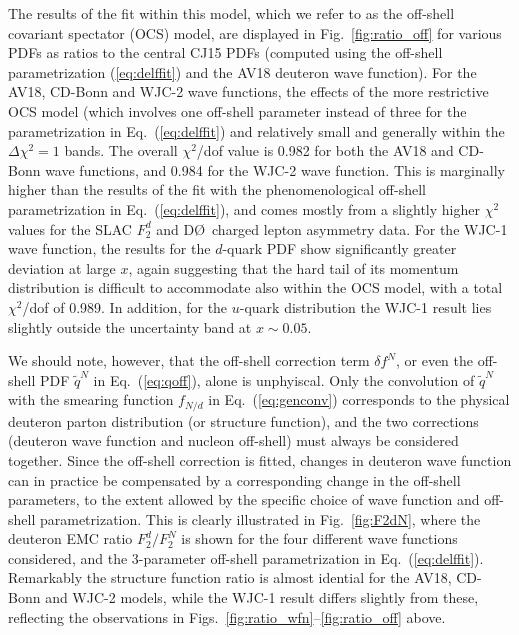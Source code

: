 \documentclass[aps,prd,amsmath,preprint]{revtex4}
\begin{document}
The results of the fit within this model, which we refer to as
the off-shell covariant spectator (OCS) model, are displayed in
Fig.~\ref{fig:ratio_off} for various PDFs as ratios to the
central CJ15 PDFs (computed using the off-shell parametrization
(\ref{eq:delffit}) and the AV18 deuteron wave function).
For the AV18, CD-Bonn and WJC-2 wave functions, the effects of
the more restrictive OCS model (which involves one off-shell
parameter instead of three for the parametrization in
Eq.~(\ref{eq:delffit}) and relatively small and generally
within the $\Delta\chi^2=1$ bands.
The overall $\chi^2$/dof value is 0.982 for both the AV18 and
CD-Bonn wave functions, and 0.984 for the WJC-2 wave function.
This is marginally higher than the results of the fit with the
phenomenological off-shell parametrization in Eq.~(\ref{eq:delffit}),
and comes mostly from a slightly higher $\chi^2$ values for the
SLAC $F_2^d$ and D\O\ charged lepton asymmetry data.
%
For the WJC-1 wave function, the results for the $d$-quark PDF
show significantly greater deviation at large $x$, again
suggesting that the hard tail of its momentum distribution
is difficult to accommodate also within the OCS model,
with a total $\chi^2$/dof of 0.989.
In addition, for the $u$-quark distribution the WJC-1 result
lies slightly outside the uncertainty band at $x \sim 0.05$.


We should note, however, that the off-shell correction term
$\delta f^N$, or even the off-shell PDF $\widetilde{q}^N$ in
Eq.~(\ref{eq:qoff}), alone is unphyiscal.  Only the convolution
of $\widetilde{q}^N$ with the smearing function $f_{N/d}$ in
Eq.~(\ref{eq:genconv}) corresponds to the physical deuteron
parton distribution (or structure function), and the two
corrections (deuteron wave function and nucleon off-shell)
must always be considered together.
Since the off-shell correction is fitted, changes in deuteron
wave function can in practice be compensated by a corresponding
change in the off-shell parameters, to the extent allowed by the
specific choice of wave function and off-shell parametrization.
This is clearly illustrated in Fig.~\ref{fig:F2dN}, where the
deuteron EMC ratio $F_2^d/F_2^N$ is shown for the four different
wave functions considered, and the 3-parameter off-shell
parametrization in Eq.~(\ref{eq:delffit}).
Remarkably the structure function ratio is almost idential for
the AV18, CD-Bonn and WJC-2 models, while the WJC-1 result
differs slightly from these, reflecting the observations in
Figs.~\ref{fig:ratio_wfn}--\ref{fig:ratio_off} above.
\end{document}

